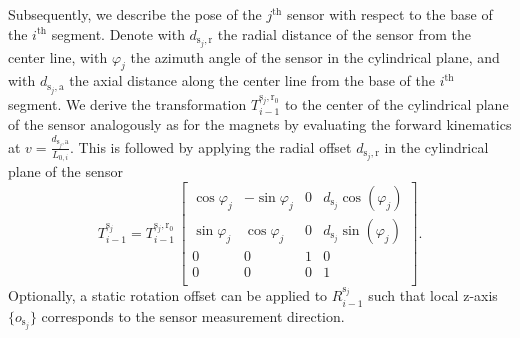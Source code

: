Subsequently, we describe the pose of the $j^\mathrm{th}$ sensor with respect to the base of the $i^\mathrm{th}$ segment.
Denote with $d_{\mathrm{s}_j,\mathrm{r}}$ the radial distance of the sensor from the center line, with $\varphi_j$ the azimuth angle of the sensor in the cylindrical plane, and with $d_{\mathrm{s}_j,\mathrm{a}}$ the axial distance along the center line from the base of the $i^\mathrm{th}$ segment.
We derive the transformation $T_{i-1}^{\mathrm{s}_j,\mathrm{r}_0}$ to the center of the cylindrical plane of the sensor %
analogously as for the magnets by evaluating the forward kinematics at $v = \frac{d_{\mathrm{s}_j,\mathrm{a}}}{L_{0,i}}$.
This is followed by applying the radial offset $d_{\mathrm{s}_j,\mathrm{r}}$ in the cylindrical plane of the sensor
\begin{equation}
    T_{i-1}^{\mathrm{s}_j} = T_{i-1}^{\mathrm{s}_j,\mathrm{r}_0}
    \,
    \begin{bmatrix}
        \cos{\varphi_j} & - \sin{\varphi_j} & 0 & d_{\mathrm{s}_j} \cos(\varphi_j)\\
        \sin{\varphi_j} & \cos{\varphi_j} & 0 & d_{\mathrm{s}_j} \sin(\varphi_j)\\
        0 & 0 & 1 & 0\\
        0 & 0 & 0 & 1\\
    \end{bmatrix}.
\end{equation}
Optionally, a static rotation offset can be applied to $R_{i-1}^{\mathrm{s}_j}$ such that local z-axis $\{ o_{\mathrm{s}_j} \}$ corresponds to the sensor measurement direction.

